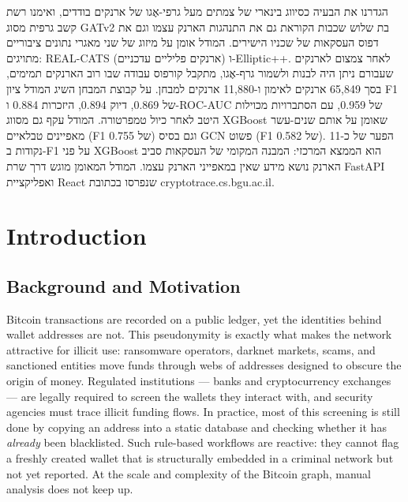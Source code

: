 \documentclass[12pt,a4paper,openany]{report}
\newcommand{\hebpar}[1]{{\raggedleft\hebrewfont\beginR #1\endR\par}}
\begin{document}
\vspace{4pt}
\hebpar{הגדרנו את הבעיה כסיווג בינארי של צמתים מעל גרפי-אֶגו של ארנקים בודדים, ואימנו רשת קשב גרפית מסוג GATv2 בת שלוש שכבות הקוראת גם את התנהגות הארנק עצמו וגם את דפוס העסקאות של שכניו הישירים. המודל אומן על מיזוג של שני מאגרי נתונים ציבוריים מתויגים: REAL-CATS (ארנקים פליליים עדכניים) ו-Elliptic++. לאחר צמצום לארנקים שעבורם ניתן היה לבנות ולשמור גרף-אֶגו, מתקבל קורפוס עבודה שבו רוב הארנקים תמימים, בסך 65,849 ארנקים לאימון ו-11,880 ארנקים למבחן. על קבוצת המבחן השיג המודל ציון F1 של 0.869, דיוק 0.894, היזכרות 0.884 ו-ROC-AUC של 0.959, עם הסתברויות מכוילות היטב לאחר כיול טמפרטורה. המודל עקף גם מסווג XGBoost שאומן על אותם שנים-עשר מאפיינים טבלאיים (F1 של 0.755) וגם בסיס GCN פשוט (F1 של 0.582). הפער של כ-11 נקודות ב-F1 על פני XGBoost הוא הממצא המרכזי: המבנה המקומי של העסקאות סביב הארנק נושא מידע שאין במאפייני הארנק עצמו. המודל המאומן מוגש דרך שרת FastAPI ואפליקציית React שנפרסו בכתובת cryptotrace.cs.bgu.ac.il.}

\tableofcontents
\listoffigures
\listoftables
\clearpage
{}
\setcounter{page}{1}

\chapter{Introduction}

\section{Background and Motivation}
Bitcoin transactions are recorded on a public ledger, yet the identities behind wallet
addresses are not. This pseudonymity is exactly what makes the network attractive for illicit
use: ransomware operators, darknet markets, scams, and sanctioned entities move funds
through webs of addresses designed to obscure the origin of money. Regulated institutions ---
banks and cryptocurrency exchanges --- are legally required to screen the wallets they
interact with, and security agencies must trace illicit funding flows. In practice, most of this
screening is still done by copying an address into a static database and checking whether it
has \emph{already} been blacklisted. Such rule-based workflows are reactive: they cannot flag
a freshly created wallet that is structurally embedded in a criminal network but not yet
reported. At the scale and complexity of the Bitcoin graph, manual analysis does not keep up.
\end{document}
